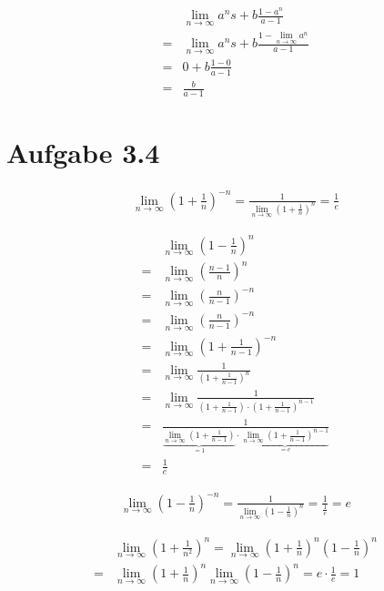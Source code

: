 \documentclass[a4paper,german,12pt,smallheadings]{scrartcl}
\begin{document}
\begin{align*}
  &\lim_{n \to \infty} a^ns + b \frac{1-a^n}{a-1} \\
  = & \lim_{n \to \infty} a^ns + b \frac{1-\lim_{n \to \infty} a^n}{a-1} \\
  = & 0 + b \frac{1-0}{a-1} \\
  = & \frac{b}{a-1}
\end{align*}

\section*{Aufgabe 3.4}

\begin{align*}
  \lim_{n \to \infty} \left(1+ \frac{1}{n}\right)^{-n} = \frac{1}{\lim_{n \to \infty} \left(1+ \frac{1}{n}\right)^{n}} = \frac{1}{e}
\end{align*}

\begin{align*}
  &\lim_{n \to \infty} \left(1-\frac{1}{n}\right)^n \\
  = &\lim_{n \to \infty} \left(\frac{n-1}{n}\right)^n \\
  = &\lim_{n \to \infty} \left(\frac{n}{n-1}\right)^{-n} \\
  = &\lim_{n \to \infty} \left(\frac{n}{n-1}\right)^{-n} \\
  = &\lim_{n \to \infty} \left(1+\frac{1}{n-1}\right)^{-n} \\
  = &\lim_{n \to \infty} \frac{1}{\left(1+\frac{1}{n-1}\right)^{n}} \\
  = &\lim_{n \to \infty} \frac{1}{\left(1+\frac{1}{n-1}\right) \cdot \left(1+\frac{1}{n-1}\right)^{n-1}} \\
  = &\frac{1}{\underbrace{\lim_{n \to \infty}\left(1+\frac{1}{n-1}\right)}_{= 1} \cdot \underbrace{\lim_{n \to \infty} \left(1+\frac{1}{n-1}\right)^{n-1}}_{= e}} \\
  = &\frac{1}{e}
\end{align*}

\begin{align*}
  \lim_{n \to \infty} \left(1- \frac{1}{n}\right)^{-n} = \frac{1}{\lim_{n \to \infty} \left(1- \frac{1}{n}\right)^{n}} = \frac{1}{\frac{1}{e}} = e
\end{align*}

\begin{align*}
  &\lim_{n \to \infty} \left(1 + \frac{1}{n^2}\right)^{n} = \lim_{n \to \infty} \left(1+\frac{1}{n}\right)^n \left(1-\frac{1}{n}\right)^n \\
  = &\lim_{n \to \infty} \left(1+\frac{1}{n}\right)^n \lim_{n \to \infty} \left(1-\frac{1}{n}\right)^n = e \cdot \frac{1}{e} = 1
\end{align*}
\end{document}
